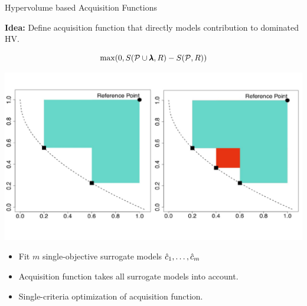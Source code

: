 \begin{frame}{Hypervolume based Acquisition Functions}

    \textbf{Idea:} Define acquisition function that directly models contribution to dominated HV.

            $$
            \max(0, S(\mathcal{P} \cup \pmb{\lambda}, R) - S(\mathcal{P}, R))
            $$
    \begin{center}
        \includegraphics[scale=0.22]{images/hv_contribution}
    \end{center}

    \begin{itemize}
            \item Fit $m$ single-objective surrogate models $\hat{c}_1, \dots, \hat{c}_m$
            \item Acquisition function takes all surrogate models into account.
            \item Single-criteria optimization of acquisition function.
    \end{itemize}

\end{frame}

